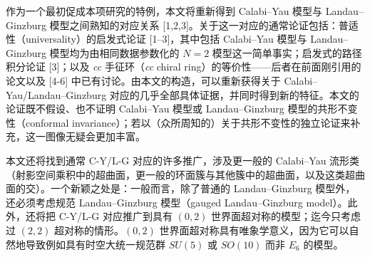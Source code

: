 

作为一个最初促成本项研究的特例，本文将重新得到 Calabi--Yau 模型与 Landau--Ginzburg 模型之间熟知的对应关系 [1,2,3]。关于这一对应的通常论证包括：普适性（universality）的启发式论证 [1--3]，其中包括 Calabi--Yau 模型与 Landau--Ginzburg 模型均为由相同数据参数化的 $N=2$ 模型这一简单事实；启发式的路径积分论证 [3]；以及 \textit{cc} 手征环（\textit{cc} chiral ring）的等价性——后者在前面刚引用的论文以及 [4-6] 中已有讨论。由本文的构造，可以重新获得关于 Calabi--Yau/Landau--Ginzburg 对应的几乎全部具体证据，并同时得到新的特征。本文的论证既不假设、也不证明 Calabi--Yau 模型或 Landau--Ginzburg 模型的共形不变性（conformal invariance）；若以（众所周知的）关于共形不变性的独立论证来补充，这一图像无疑会更加丰富。


本文还将找到通常 C-Y/L-G 对应的许多推广，涉及更一般的 Calabi--Yau 流形类（射影空间乘积中的超曲面，更一般的环面簇与其他簇中的超曲面，以及这类超曲面的交）。一个新颖之处是：一般而言，除了普通的 Landau--Ginzburg 模型外，还必须考虑规范 Landau--Ginzburg 模型（gauged Landau--Ginzburg model）。此外，还将把 C-Y/L-G 对应推广到具有 $(0,2)$ 世界面超对称的模型；迄今只考虑过 $(2,2)$ 超对称的情形。$(0,2)$ 世界面超对称具有唯象学意义，因为它可以自然地导致例如具有时空大统一规范群 $SU(5)$ 或 $SO(10)$ 而非 $E_6$ 的模型。


